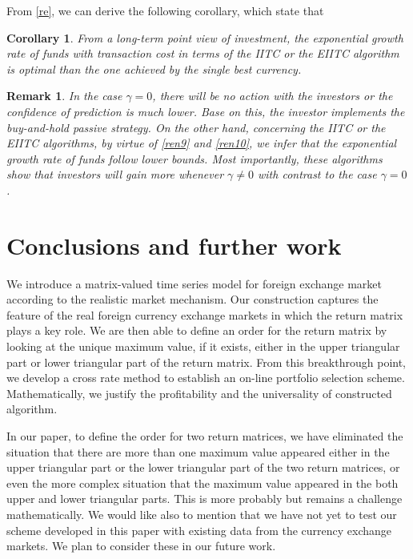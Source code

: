 \documentclass[11pt]{article}
\newtheorem{cor}[thm]{Corollary}
\newtheorem{remark}{Remark}[section]
\numberwithin{equation}{section}
\begin{document}
From \eqref{re}, we can derive the following corollary, which state that 
\begin{cor}
From a long-term point view of investment, the exponential growth rate of funds with transaction cost in terms of the IITC or the EIITC algorithm is optimal than  the one achieved by the single 
best currency.
\end{cor}
\begin{remark}
In the case $\gamma =0$, there will be no action with the investors or the confidence of prediction is much  lower. Base on this,  the investor implements the buy-and-hold passive strategy.  
On the other hand, concerning the IITC or the EIITC algorithms, by virtue of \eqref{ren9} and \eqref{ren10},  we infer that the exponential growth rate of funds follow lower bounds. Most importantly, 
these algorithms show that investors will gain more whenever $\gamma \neq0$ with contrast to the case  $\gamma =0$.
\end{remark}

\section{Conclusions and further work}
We introduce a matrix-valued time series model for foreign exchange market according to the realistic market mechanism. Our construction captures the feature of the real foreign currency exchange 
markets in which the return matrix plays a key role. We are then able to define an order for the return matrix by looking at the unique maximum value, if it exists, either in the upper triangular part or 
lower triangular part of the return matrix. From this breakthrough point, we develop a cross rate method to establish an on-line portfolio selection scheme. Mathematically, we justify the profitability 
and the universality of constructed algorithm. 

In our paper, to define the order for two return matrices, we have eliminated the situation that there are more than one maximum value appeared either in the upper triangular part or the lower triangular 
part of the two return matrices, or even the more complex situation that the maximum value appeared in the both upper and lower triangular parts. This is more probably but remains a challenge 
mathematically. We would like also to mention that we have not yet to test our scheme developed in this paper with existing data from the currency exchange markets. We plan to consider these in 
our future work.
\end{document}
